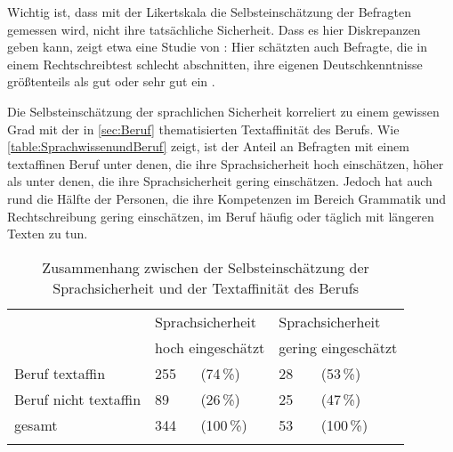 Wichtig ist, dass mit der Likertskala die Selbsteinschätzung der Befragten gemessen wird, nicht ihre tatsächliche Sicherheit. 
Dass es hier Diskrepanzen geben kann, zeigt etwa eine Studie von \citet{Gartig2010}:
Hier schätzten auch Befragte, die in einem Rechtschreibtest schlecht abschnitten, ihre eigenen Deutschkenntnisse größtenteils als gut oder sehr gut ein \citep[s.][12--13]{Gartig2010}. 

Die Selbsteinschätzung der sprachlichen Sicherheit korreliert zu einem gewissen Grad mit der in \autoref{sec:Beruf} thematisierten Textaffinität des Berufs. 
Wie \autoref{table:SprachwissenundBeruf} zeigt, ist der Anteil an Befragten mit einem textaffinen Beruf unter denen, die ihre Sprachsicherheit hoch einschätzen, höher als unter denen, die ihre Sprachsicherheit gering einschätzen. 
Jedoch hat auch rund die Hälfte der Personen, die ihre Kompetenzen im Bereich Grammatik und Rechtschreibung gering einschätzen, im Beruf häufig oder täglich mit längeren Texten zu tun. 

\begin{table}[]
\begin{tabular}{lllll}
\lsptoprule
                      & \multicolumn{2}{l}{Sprachsicherheit} & \multicolumn{2}{l}{Sprachsicherheit} \\
                      & \multicolumn{2}{l}{ hoch eingeschätzt}          & \multicolumn{2}{l}{ gering eingeschätzt}           \\
\midrule
Beruf textaffin       & 255               & (74\,\%)               & 28                & (53\,\%)                \\
Beruf nicht textaffin & 89                & (26\,\%)               & 25                & (47\,\%)                \\
gesamt                & 344               & (100\,\%)              & 53                & (100\,\%)              \\
\lspbottomrule
\end{tabular}
\caption{Zusammenhang zwischen der Selbsteinschätzung der Sprachsicherheit und der Textaffinität des Berufs}
\label{table:SprachwissenundBeruf}
\end{table}

